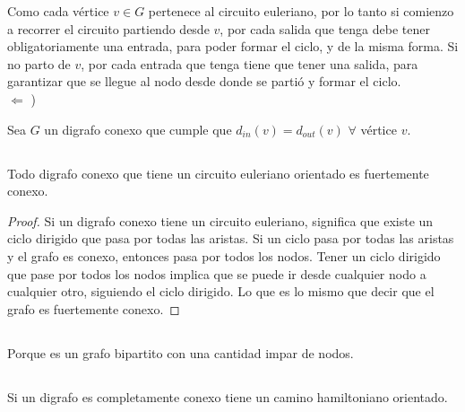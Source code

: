 Como cada vértice $v \in G$ pertenece al circuito euleriano, por lo tanto si comienzo a recorrer el circuito partiendo desde $v$, por cada salida que tenga debe tener obligatoriamente una entrada, para poder formar el ciclo, y de la misma forma. Si no parto de $v$, por cada entrada que tenga tiene que tener una salida, para garantizar que se llegue al nodo desde donde se partió y formar el ciclo. \\

$\Longleftarrow$ )

Sea $G$ un digrafo conexo que cumple que $d_{in}(v) = d_{out}(v)$ $\forall$ vértice $v$. 

\subsection{}

\begin{lema}
    Todo digrafo conexo que tiene un circuito euleriano orientado es fuertemente conexo.
\end{lema}

\begin{proof}
    Si un digrafo conexo tiene un circuito euleriano, significa que existe un ciclo dirigido que pasa por todas las aristas. Si un ciclo pasa por todas las aristas y el grafo es conexo, entonces pasa por todos los nodos. Tener un ciclo dirigido que pase por todos los nodos implica que se puede ir desde cualquier nodo a cualquier otro, siguiendo el ciclo dirigido. Lo que es lo mismo que decir que el grafo es fuertemente conexo.
\end{proof}

\setcounter{subsection}{11}
\subsection{}
Porque es un grafo bipartito con una cantidad impar de nodos.

\setcounter{subsection}{13}
\subsection{}

\begin{lema}
    Si un digrafo es completamente conexo tiene un camino hamiltoniano orientado.
\end{lema}

